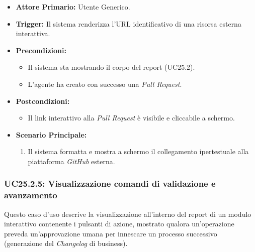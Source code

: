 \documentclass[12pt, a4paper]{article}
\begin{document}
\begin{itemize}
    \item \textbf{Attore Primario:} Utente Generico.
    \item \textbf{Trigger:} Il sistema renderizza l'URL identificativo di una risorsa esterna interattiva.
    \item \textbf{Precondizioni:}
    \begin{itemize}
        \item Il sistema sta mostrando il corpo del report (UC25.2).
        \item L'agente ha creato con successo una \textit{Pull Request}.
    \end{itemize}
    \item \textbf{Postcondizioni:}
    \begin{itemize}
        \item Il link interattivo alla \textit{Pull Request} è visibile e cliccabile a schermo.
    \end{itemize}
    \item \textbf{Scenario Principale:}
    \begin{enumerate}
        \item Il sistema formatta e mostra a schermo il collegamento ipertestuale alla piattaforma \textit{GitHub} esterna.
    \end{enumerate}
\end{itemize}

\subsubsection{UC25.2.5: Visualizzazione comandi di validazione e avanzamento}\label{uc:25.2.5}
Questo caso d'uso descrive la visualizzazione all'interno del report di un modulo interattivo contenente i pulsanti di azione, mostrato qualora un'operazione preveda un'approvazione umana per innescare un processo successivo (generazione del \textit{Changelog} di business).
\end{document}
